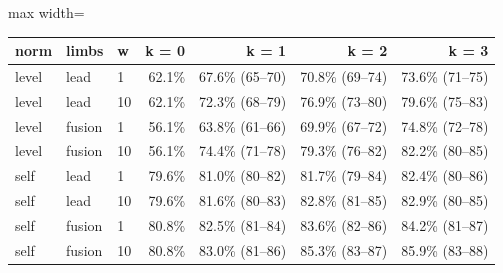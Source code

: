 \begin{adjustbox}{max width=\textwidth}
{\footnotesize
\begin{tabular}{lllrrrr}
\toprule
\textbf{norm} & \textbf{limbs} & \textbf{w} & \textbf{k = 0} & \textbf{k = 1} & \textbf{k = 2} & \textbf{k = 3} \\
\midrule
level & lead & 1 & 62.1\% & 67.6\% (65--70) & 70.8\% (69--74) & 73.6\% (71--75) \\
level & lead & 10 & 62.1\% & 72.3\% (68--79) & 76.9\% (73--80) & 79.6\% (75--83) \\
level & fusion & 1 & 56.1\% & 63.8\% (61--66) & 69.9\% (67--72) & 74.8\% (72--78) \\
level & fusion & 10 & 56.1\% & 74.4\% (71--78) & 79.3\% (76--82) & 82.2\% (80--85) \\
self & lead & 1 & 79.6\% & 81.0\% (80--82) & 81.7\% (79--84) & 82.4\% (80--86) \\
self & lead & 10 & 79.6\% & 81.6\% (80--83) & 82.8\% (81--85) & 82.9\% (80--85) \\
self & fusion & 1 & 80.8\% & 82.5\% (81--84) & 83.6\% (82--86) & 84.2\% (81--87) \\
self & fusion & 10 & 80.8\% & 83.0\% (81--86) & 85.3\% (83--87) & 85.9\% (83--88) \\
\bottomrule
\end{tabular}
}
\end{adjustbox}
